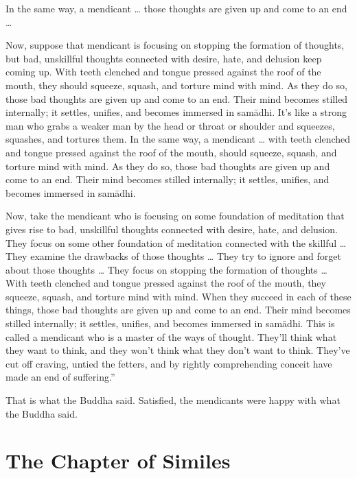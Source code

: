 \documentclass[12pt,openany]{book}%
\let\oldcontentsline\contentsline
\newcommand{\nopagecontentsline}[3]{\oldcontentsline{#1}{#2}{}}
\newcommand*{\tocchapterline}[1]{\bfseries\itshape{#1}}
\begin{document}
In the same way, a mendicant … those thoughts are given up and come to an end … 

Now, suppose that mendicant is focusing on stopping the formation of thoughts, but bad, unskillful thoughts connected with desire, hate, and delusion keep coming up. With teeth clenched and tongue pressed against the roof of the mouth, they should squeeze, squash, and torture mind with mind. As they do so, those bad thoughts are given up and come to an end. Their mind becomes stilled internally; it settles, unifies, and becomes immersed in \textsanskrit{samādhi}. It’s like a strong man who grabs a weaker man by the head or throat or shoulder and squeezes, squashes, and tortures them. In the same way, a mendicant … with teeth clenched and tongue pressed against the roof of the mouth, should squeeze, squash, and torture mind with mind. As they do so, those bad thoughts are given up and come to an end. Their mind becomes stilled internally; it settles, unifies, and becomes immersed in \textsanskrit{samādhi}. 

Now, take the mendicant who is focusing on some foundation of meditation that gives rise to bad, unskillful thoughts connected with desire, hate, and delusion. They focus on some other foundation of meditation connected with the skillful … They examine the drawbacks of those thoughts … They try to ignore and forget about those thoughts … They focus on stopping the formation of thoughts … With teeth clenched and tongue pressed against the roof of the mouth, they squeeze, squash, and torture mind with mind. When they succeed in each of these things, those bad thoughts are given up and come to an end. Their mind becomes stilled internally; it settles, unifies, and becomes immersed in \textsanskrit{samādhi}. This is called a mendicant who is a master of the ways of thought. They’ll think what they want to think, and they won’t think what they don’t want to think. They’ve cut off craving, untied the fetters, and by rightly comprehending conceit have made an end of suffering.” 

That is what the Buddha said. Satisfied, the mendicants were happy with what the Buddha said. 

%
\chapter*{The Chapter of Similes}
\addcontentsline{toc}{chapter}{\tocchapterline{The Chapter of Similes}}
\addtocontents{toc}{\let\protect\contentsline\protect\oldcontentsline}
\end{document}
